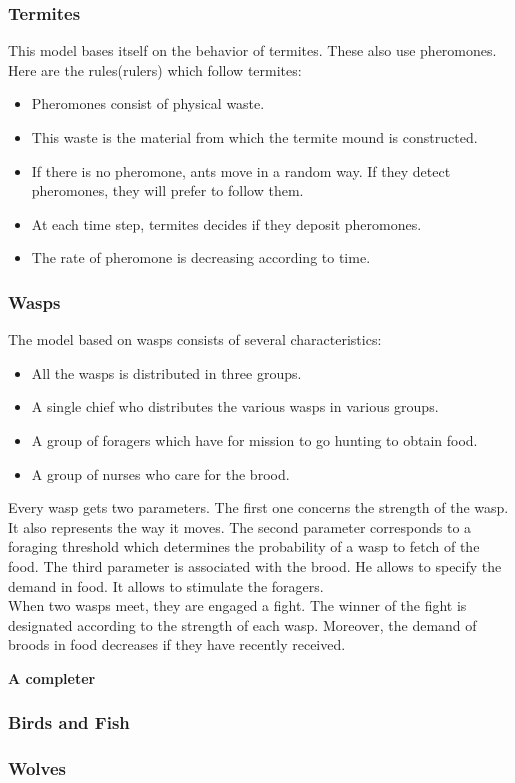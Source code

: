 \subsubsection{Termites}

This model bases itself on the behavior of termites. These also use pheromones. Here are the rules(rulers) which follow termites:

\begin{itemize}
\item Pheromones consist of physical waste.
\item This waste is the material from which the termite mound is constructed.
\item If there is no pheromone, ants move in a random way. If they detect pheromones, they will prefer to follow them.
\item At each time step, termites decides if they deposit pheromones.
\item The rate of pheromone is decreasing according to time.
\end{itemize} 

\newpage

\subsubsection{Wasps}

The model based on wasps consists of several characteristics:

\begin{itemize}
\item All the wasps is distributed in three groups.
\item A single chief who distributes the various wasps in various groups.
\item A group of foragers which have for mission to go hunting to obtain food.
\item A group of nurses who care for the brood.
\end{itemize}

Every wasp gets two parameters. The first one concerns the strength of the wasp. It also represents the way it moves. The second parameter corresponds to a foraging threshold which determines the probability of a wasp to fetch of the food. The third parameter is associated with the brood. He allows to specify the demand in food. It allows to stimulate the foragers.\\
When two wasps meet, they are engaged a fight.
The winner of the fight is designated according to the strength of each wasp. Moreover, the demand of broods in food decreases if they have recently received.

\textbf{A completer}

\newpage

\subsubsection{Birds and Fish}

\newpage

\subsubsection{Wolves}

